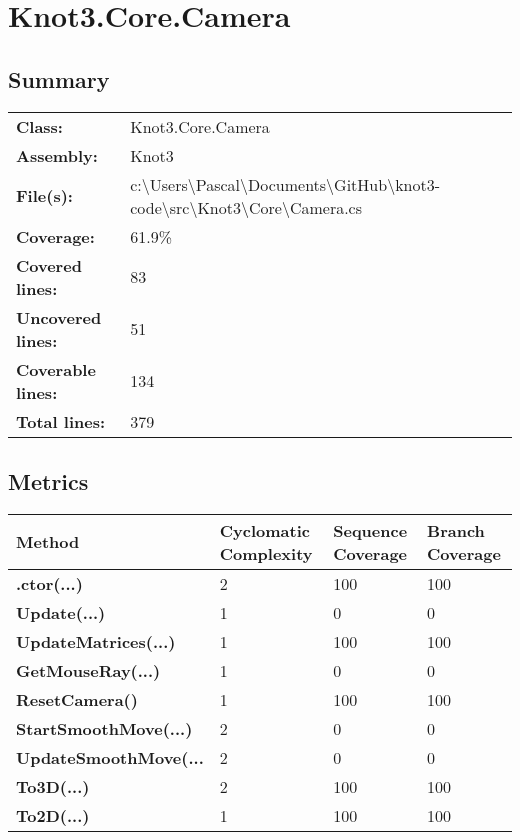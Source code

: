 \documentclass[a4paper,10pt]{article}
\begin{document}
\section{Knot3.Core.Camera}
\subsection{Summary}
\begin{longtable}[l]{ll}
\textbf{Class:} & Knot3.Core.Camera\\
\textbf{Assembly:} & Knot3\\
\textbf{File(s):} & \begin{minipage}[t]{12cm}{c:\textbackslash Users\textbackslash Pascal\textbackslash Documents\textbackslash GitHub\textbackslash knot3-code\textbackslash src\textbackslash Knot3\textbackslash Core\textbackslash Camera.cs}\end{minipage} \\
\textbf{Coverage:} & 61.9\%\\
\textbf{Covered lines:} & 83\\
\textbf{Uncovered lines:} & 51\\
\textbf{Coverable lines:} & 134\\
\textbf{Total lines:} & 379\\
\end{longtable}
\subsection{Metrics}
\begin{longtable}[l]{|l|l|l|l|}
\hline
\textbf{Method} & \textbf{Cyclomatic Complexity} & \textbf{Sequence Coverage} & \textbf{Branch Coverage}\\
\hline
\textbf{.ctor(...)} & 2 & 100 & 100\\
\hline
\textbf{Update(...)} & 1 & 0 & 0\\
\hline
\textbf{UpdateMatrices(...)} & 1 & 100 & 100\\
\hline
\textbf{GetMouseRay(...)} & 1 & 0 & 0\\
\hline
\textbf{ResetCamera()} & 1 & 100 & 100\\
\hline
\textbf{StartSmoothMove(...)} & 2 & 0 & 0\\
\hline
\textbf{UpdateSmoothMove(...} & 2 & 0 & 0\\
\hline
\textbf{To3D(...)} & 2 & 100 & 100\\
\hline
\textbf{To2D(...)} & 1 & 100 & 100\\
\hline
\end{longtable}
\end{document}
